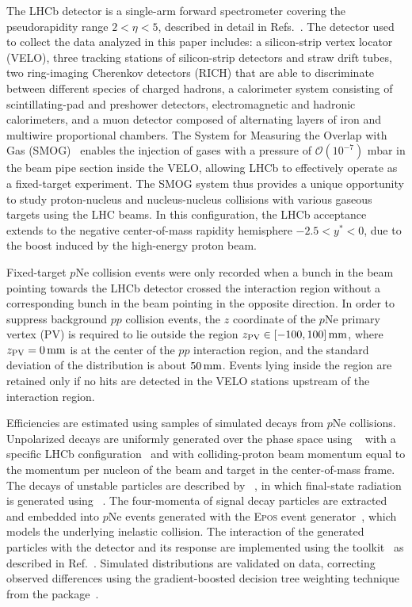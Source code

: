 The LHCb detector is a single-arm forward spectrometer covering the pseudorapidity range $2 < \eta < 5$, described in detail in Refs.~\cite{LHCb-DP-2008-001,LHCb-DP-2014-002}.
The detector used to collect the data analyzed in this paper includes: a silicon-strip vertex locator (VELO), three tracking stations of silicon-strip detectors and straw drift tubes,
two ring-imaging Cherenkov detectors (RICH) that are able to discriminate between different species of charged hadrons, a calorimeter system consisting of scintillating-pad and preshower detectors, electromagnetic and hadronic calorimeters, and a muon detector composed of alternating layers of iron and multiwire proportional chambers.
The System for Measuring the Overlap with Gas (SMOG)~\cite{FerroLuzzi:2005em} enables the injection of gases with a pressure of $\mathcal{O}(10^{-7})$ mbar in the beam pipe section inside the VELO, allowing LHCb to effectively operate as a fixed-target experiment. The SMOG system thus provides a unique opportunity to study proton-nucleus and nucleus-nucleus collisions with various gaseous targets using the LHC beams. In this configuration, the LHCb acceptance extends to the negative center-of-mass rapidity hemisphere $-2.5 < y^* < 0$, due to the boost induced by the high-energy proton beam.

Fixed-target $p$Ne collision events were only recorded when a bunch in the beam pointing towards the LHCb detector crossed the interaction region without a corresponding bunch in the beam pointing in the opposite direction. In order to suppress background $pp$ collision events, the $z$ coordinate of the $p$Ne primary vertex (PV) is required to lie outside the region $z_{\rm{PV}} \in [-100,100]\text{\,mm}$, where $z_{\rm{PV}} = 0\text{\,mm}$ is at the center of the $pp$ interaction region, and the standard deviation of the distribution is about $50\text{\,mm}$. Events lying inside the region are retained only if no hits are detected in the VELO stations upstream of the interaction region.

Efficiencies are estimated using samples of simulated \Lcpkpi decays from $p$Ne collisions.
Unpolarized \Lcpkpi decays are uniformly generated over the phase space using \pythia~\cite{Sjostrand:2007gs} with a specific LHCb configuration~\cite{LHCb-PROC-2010-056} and with colliding-proton beam momentum equal to the momentum per nucleon of the beam and target in the center-of-mass frame. The decays of unstable particles are described by \evtgen~\cite{Lange:2001uf}, in which final-state radiation is generated using \photos~\cite{davidson2015photos}.
The four-momenta of signal decay particles are extracted and embedded into $p$Ne events generated with the \textsc{Epos} event generator~\cite{Pierog:2013ria}, which models the underlying inelastic collision.
The interaction of the generated particles with the detector and its response are implemented using the \geant toolkit~\cite{Agostinelli:2002hh,Allison:2006ve} as described in Ref.~\cite{LHCb-PROC-2011-006}.
Simulated distributions are validated on data, correcting observed differences using the gradient-boosted decision tree weighting technique from the \hepml package~\cite{Rogozhnikov:2016bdp}.



